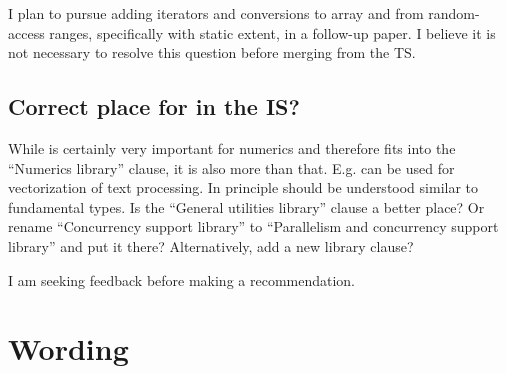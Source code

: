 I plan to pursue adding iterators and conversions to array and from random-access ranges, specifically  with static extent, in a follow-up paper.
I believe it is not necessary to resolve this question before merging  from the TS.

\subsection{Correct place for  in the IS?}

While  is certainly very important for numerics and therefore fits into the “Numerics library” clause, it is also more than that.
E.g.  can be used for vectorization of text processing.
In principle  should be understood similar to fundamental types.
Is the “General utilities library” clause a better place?
Or rename “Concurrency support library” to “Parallelism and concurrency support library” and put it there?
Alternatively, add a new library clause?

I am seeking feedback before making a recommendation.

\section{Wording}





